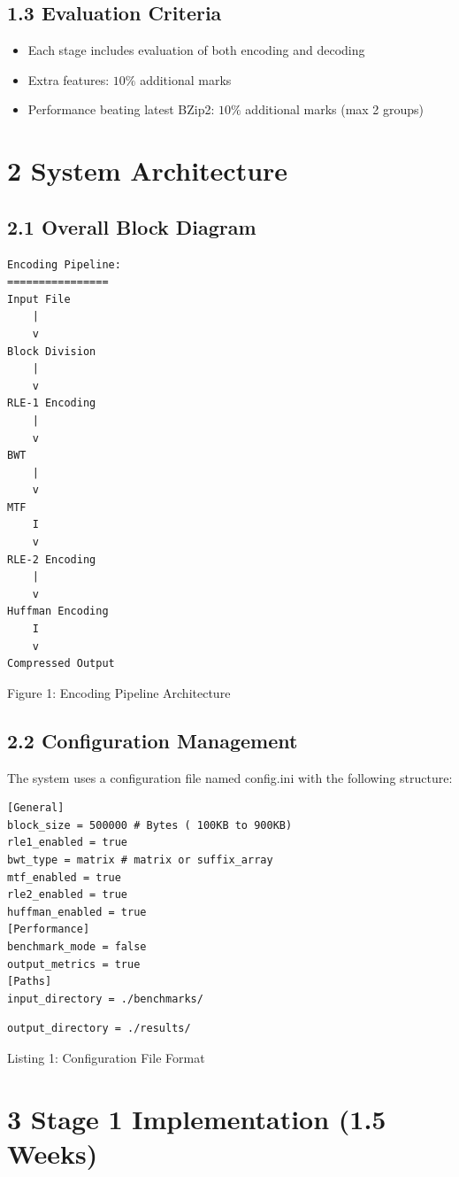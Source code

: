 \documentclass[10pt]{article}
\begin{document}
\subsection*{1.3 Evaluation Criteria}
\begin{itemize}
  \item Each stage includes evaluation of both encoding and decoding
  \item Extra features: $10 \%$ additional marks
  \item Performance beating latest BZip2: $10 \%$ additional marks (max 2 groups)
\end{itemize}

\section*{2 System Architecture}
\subsection*{2.1 Overall Block Diagram}
\begin{verbatim}
Encoding Pipeline:
================
Input File
    |
    v
Block Division
    |
    v
RLE-1 Encoding
    |
    v
BWT
    |
    v
MTF
    I
    v
RLE-2 Encoding
    |
    v
Huffman Encoding
    I
    v
Compressed Output
\end{verbatim}

Figure 1: Encoding Pipeline Architecture

\subsection*{2.2 Configuration Management}
The system uses a configuration file named config.ini with the following structure:

\begin{verbatim}
[General]
block_size = 500000 # Bytes ( 100KB to 900KB)
rle1_enabled = true
bwt_type = matrix # matrix or suffix_array
mtf_enabled = true
rle2_enabled = true
huffman_enabled = true
[Performance]
benchmark_mode = false
output_metrics = true
[Paths]
input_directory = ./benchmarks/
\end{verbatim}

\begin{verbatim}
output_directory = ./results/
\end{verbatim}

Listing 1: Configuration File Format

\section*{3 Stage 1 Implementation (1.5 Weeks)}
\end{document}
